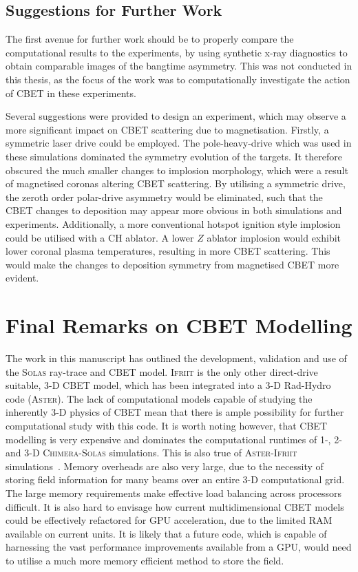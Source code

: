 \subsection{Suggestions for Further Work}

The first avenue for further work should be to properly compare the computational results to the experiments, by using synthetic x-ray diagnostics to obtain comparable images of the bangtime asymmetry.
This was not conducted in this thesis, as the focus of the work was to computationally investigate the action of \ac{CBET} in these experiments.

Several suggestions were provided to design an experiment, which may observe a more significant impact on \ac{CBET} scattering due to magnetisation.
Firstly, a symmetric laser drive could be employed.
The pole-heavy-drive which was used in these simulations dominated the symmetry evolution of the targets.
It therefore obscured the much smaller changes to implosion morphology, which were a result of magnetised coronas altering \ac{CBET} scattering.
By utilising a symmetric drive, the zeroth order polar-drive asymmetry would be eliminated, such that the \ac{CBET} changes to deposition may appear more obvious in both simulations and experiments.
Additionally, a more conventional hotspot ignition style implosion could be utilised with a CH ablator.
A lower $Z$ ablator implosion would exhibit lower coronal plasma temperatures, resulting in more \ac{CBET} scattering.
This would make the changes to deposition symmetry from magnetised \ac{CBET} more evident.

\section{Final Remarks on CBET Modelling}

The work in this manuscript has outlined the development, validation and use of the \textsc{Solas} ray-trace and \ac{CBET} model.
\textsc{Ifriit} is the only other direct-drive suitable, 3-D \ac{CBET} model, which has been integrated into a 3-D \ac{Rad-Hydro} code (\textsc{Aster}).
The lack of computational models capable of studying the inherently 3-D physics of \ac{CBET} mean that there is ample possibility for further computational study with this code.
It is worth noting however, that \ac{CBET} modelling is very expensive and dominates the computational runtimes of 1-, 2- and 3-D \textsc{Chimera}-\textsc{Solas} simulations.
This is also true of \textsc{Aster}-\textsc{Ifriit} simulations~\cite{colaitis_inverse_2021}.
Memory overheads are also very large, due to the necessity of storing field information for many beams over an entire 3-D computational grid.
The large memory requirements make effective load balancing across processors difficult.
It is also hard to envisage how current multidimensional \ac{CBET} models could be effectively refactored for \ac{GPU} acceleration, due to the limited \ac{RAM} available on current units.
It is likely that a future code, which is capable of harnessing the vast performance improvements available from a \ac{GPU}, would need to utilise a much more memory efficient method to store the field.

